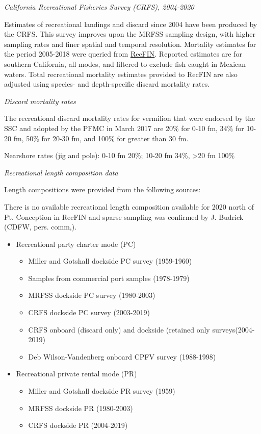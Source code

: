 \documentclass[11pt,
  english,
  a4paper,
]{article}
\begin{document}
\emph{California Recreational Fisheries Survey (CRFS), 2004-2020}

Estimates of recreational landings and discard since 2004 have been produced by the CRFS. This survey improves upon the MRFSS sampling design, with higher sampling rates and finer spatial and temporal resolution. Mortality estimates for the period 2005-2018 were queried from {\href{www.recfin.org}{RecFIN}\leavevmode\tagmcend\tagstructend}. Reported estimates are for southern California, all modes, and filtered to exclude fish caught in Mexican waters. Total recreational mortality estimates provided to RecFIN are also adjusted using species- and depth-specific discard mortality rates.

\emph{Discard mortality rates}

The recreational discard mortality rates for vermilion that were endorsed by the SSC and adopted by the PFMC in March 2017 are 20\% for 0-10 fm, 34\% for 10-20 fm, 50\% for 20-30 fm, and 100\% for greater than 30 fm.

Nearshore rates (jig and pole): 0-10 fm 20\%; 10-20 fm 34\%, \textgreater20 fm 100\%

\emph{Recreational length composition data}

Length compositions were provided from the following sources:

There is no available recreational length composition available for 2020 north of Pt. Conception in RecFIN and sparse sampling was confirmed by J. Budrick (CDFW, pers. comm,).

\begin{itemize}
  \item Recreational party charter mode (PC)
   \begin{itemize}
     \item Miller and Gotshall dockside PC survey (1959-1960) 
     \item Samples from commercial port samples (1978-1979)
     \item MRFSS dockside PC survey (1980-2003)    
     \item CRFS dockside PC survey (2003-2019)
     \item CRFS onboard (discard only) and dockside (retained only surveys(2004-2019)
     \item Deb Wilson-Vandenberg onboard CPFV survey (1988-1998)
   \end{itemize}
  \item Recreational private rental mode (PR)
   \begin{itemize}
     \item Miller and Gotshall dockside PR survey (1959) 
     \item MRFSS dockside PR (1980-2003)
     \item CRFS dockside PR (2004-2019)
  \end{itemize}
\end{itemize}
\end{document}
